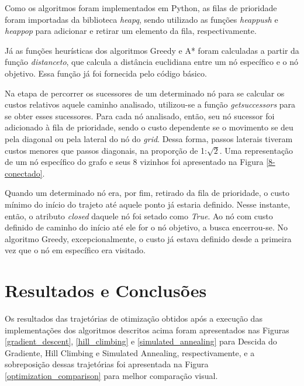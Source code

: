 \documentclass[conference]{IEEEtran}
\begin{document}
Como os algoritmos foram implementados em Python, as filas de prioridade foram importadas da biblioteca \textit{heapq}, sendo utilizado as funções \textit{heappush} e \textit{heappop} para adicionar e retirar um elemento da fila, respectivamente.

Já as funções heurísticas dos algoritmos Greedy e A* foram calculadas a partir da função \textit{distance\underline{\space}to}, que calcula a distância euclidiana entre um nó específico e o nó objetivo. Essa função já foi fornecida pelo código básico.

Na etapa de percorrer os sucessores de um determinado nó para se calcular os custos relativos aquele caminho analisado, utilizou-se a função \textit{get\underline{\space}successors} para se obter esses sucessores. Para cada nó analisado, então, seu nó sucessor foi adicionado à fila de prioridade, sendo o custo dependente se o movimento se deu pela diagonal ou pela lateral do nó do \textit{grid}. Dessa forma, passos laterais tiveram custos menores que passos diagonais, na proporção de 1:$\sqrt{2}$. Uma representação de um nó específico do grafo e seus 8 vizinhos foi apresentado na Figura \ref{8-conectado}.


Quando um determinado nó era, por fim, retirado da fila de prioridade, o custo mínimo do início do trajeto até aquele ponto já estaria definido. Nesse instante, então, o atributo \textit{closed} daquele nó foi setado como \textit{True}. Ao nó com custo definido de caminho do início até ele for o nó objetivo, a busca encerrou-se. No algoritmo Greedy, excepcionalmente, o custo já estava definido desde a primeira vez que o nó em específico era visitado.

\section{Resultados e Conclusões}
Os resultados das trajetórias de otimização obtidos após a execução das implementações dos algoritmos descritos acima foram apresentados nas Figuras \ref{gradient_descent}, \ref{hill_climbing} e \ref{simulated_annealing} para Descida do Gradiente, Hill Climbing e Simulated Annealing, respectivamente, e a sobreposição dessas trajetórias foi apresentada na Figura \ref{optimization_comparison} para melhor comparação visual.
\end{document}
